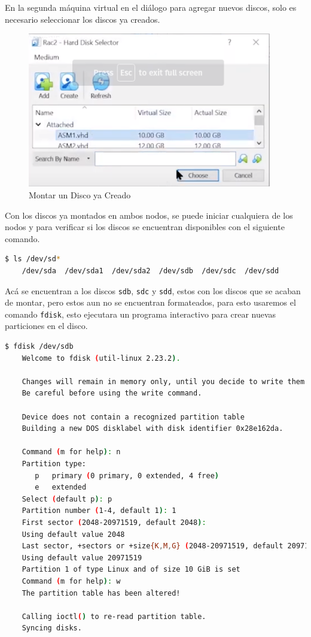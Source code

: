 \documentclass{article}
\begin{document}
En la segunda máquina virtual en el diálogo para agregar nuevos discos, solo es necesario seleccionar los discos ya creados.

\begin{figure}[H]
		\begin{center}
			\includegraphics[width=0.95\textwidth]{vm_shared_disk_mounting.png}
		\end{center}
		\caption{Montar un Disco ya Creado}
\end{figure}

Con los discos ya montados en ambos nodos, se puede iniciar cualquiera de los nodos y para verificar si los discos se encuentran disponibles con el siguiente comando.

\begin{lstlisting}[style=mystyle,language=bash]
	$ ls /dev/sd*
	/dev/sda  /dev/sda1  /dev/sda2  /dev/sdb  /dev/sdc  /dev/sdd
\end{lstlisting}

Acá se encuentran a los discos \texttt{sdb}, \texttt{sdc} y \texttt{sdd}, estos con los discos que se acaban de montar, pero estos aun no se encuentran formateados, para esto usaremos el comando \texttt{fdisk}, esto ejecutara un programa interactivo para crear nuevas particiones en el disco.

\begin{lstlisting}[style=mystyle,language=bash]
	$ fdisk /dev/sdb
	Welcome to fdisk (util-linux 2.23.2).

	Changes will remain in memory only, until you decide to write them.
	Be careful before using the write command.

	Device does not contain a recognized partition table
	Building a new DOS disklabel with disk identifier 0x28e162da.

	Command (m for help): n
	Partition type:
	   p   primary (0 primary, 0 extended, 4 free)
	   e   extended
	Select (default p): p
	Partition number (1-4, default 1): 1
	First sector (2048-20971519, default 2048):
	Using default value 2048
	Last sector, +sectors or +size{K,M,G} (2048-20971519, default 20971519):
	Using default value 20971519
	Partition 1 of type Linux and of size 10 GiB is set
	Command (m for help): w
	The partition table has been altered!

	Calling ioctl() to re-read partition table.
	Syncing disks.
\end{lstlisting}
\end{document}
